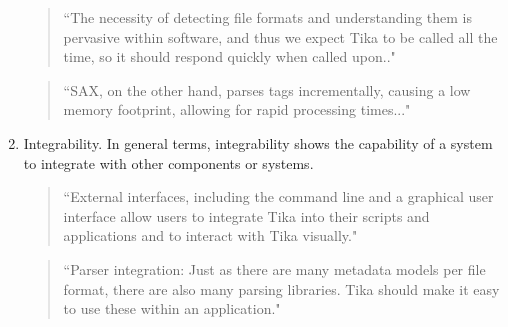 \documentclass{article}
\begin{document}
\begin{enumerate}
    \begin{quote}
        ``The necessity of detecting file formats and understanding them is pervasive within software, and thus we expect Tika to be called all the time, so it should respond quickly when called upon.."
    \end{quote}
    
    \begin{quote}
        ``SAX, on the other hand, parses tags incrementally, causing a low memory footprint, allowing for rapid processing times..."     \end{quote}
    
    \item Integrability. In general terms, integrability shows the capability of a system to integrate with other components or systems. 
    
    \begin{quote}
        ``External interfaces, including the command line and a graphical user interface allow users to integrate Tika into their scripts and applications and to interact with Tika visually."
    \end{quote}
    
    \begin{quote}
        ``Parser integration: Just as there are many metadata models per file format, there are also many parsing libraries. Tika should make it easy to use these within an application."
    \end{quote}
    
\end{enumerate}
\end{document}
